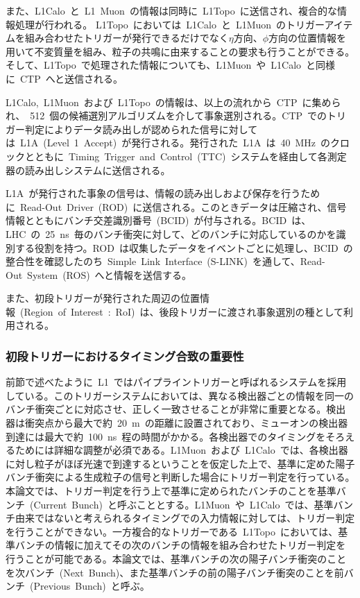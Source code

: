 また、L1Calo~と~L1~Muon~の情報は同時に~L1Topo~に送信され、複合的な情報処理が行われる。
L1Topo~においては~L1Calo~と~L1Muon~のトリガーアイテムを組み合わせたトリガーが発行できるだけでなく$\eta$方向、$\phi$方向の位置情報を用いて不変質量を組み、粒子の共鳴に由来することの要求も行うことができる。そして、L1Topo~で処理された情報についても、L1Muon~や~L1Calo~と同様に~CTP~へと送信される。

L1Calo,~L1Muon~および~L1Topo~の情報は、以上の流れから~CTP~に集められ、~512~個の候補選別アルゴリズムを介して事象選別される。CTP~でのトリガー判定によりデータ読み出しが認められた信号に対しては~L1A~(Level~1~Accept)~が発行される。発行された~L1A~は~40~MHz~のクロックとともに~Timing~Trigger~and~Control~(TTC)~システムを経由して各測定器の読み出しシステムに送信される。

L1A~が発行された事象の信号は、情報の読み出しおよび保存を行うために~Read-Out~Driver~(ROD)~に送信される。このときデータは圧縮され、信号情報とともにバンチ交差識別番号~(BCID)~が付与される。BCID~は、LHC~の~25~ns~毎のバンチ衝突に対して、どのバンチに対応しているのかを識別する役割を持つ。ROD~は収集したデータをイベントごとに処理し、BCID~の整合性を確認したのち~Simple~Link~Interface~(S-LINK)~\cite{URL:20}を通して、Read-Out~System~(ROS)~へと情報を送信する。

また、初段トリガーが発行された周辺の位置情報~(Region~of~Interest~:~RoI)~は、後段トリガーに渡され事象選別の種として利用される。

\subsubsection{初段トリガーにおけるタイミング合致の重要性}
前節で述べたように~L1~ではパイプライントリガーと呼ばれるシステムを採用している。このトリガーシステムにおいては、異なる検出器ごとの情報を同一のバンチ衝突ごとに対応させ、正しく一致させることが非常に重要となる。検出器は衝突点から最大で約~20~m~の距離に設置されており、ミューオンの検出器到達には最大で約~100~ns~程の時間がかかる。各検出器でのタイミングをそろえるためには詳細な調整が必須である。L1Muon~および~L1Calo~では、各検出器に対し粒子がほぼ光速で到達するということを仮定した上で、基準に定めた陽子バンチ衝突による生成粒子の信号と判断した場合にトリガー判定を行っている。本論文では、トリガー判定を行う上で基準に定められたバンチのことを基準バンチ~(Current~Bunch)~と呼ぶこととする。L1Muon~や~L1Calo~では、基準バンチ由来ではないと考えられるタイミングでの入力情報に対しては、トリガー判定を行うことができない。一方複合的なトリガーである~L1Topo~においては、基準バンチの情報に加えてその次のバンチの情報を組み合わせたトリガー判定を行うことが可能である。本論文では、基準バンチの次の陽子バンチ衝突のことを次バンチ~(Next~Bunch)、また基準バンチの前の陽子バンチ衝突のことを前バンチ~(Previous~Bunch)~と呼ぶ。

